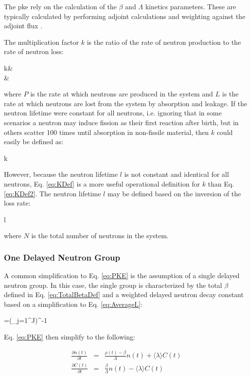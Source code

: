 The \gls{pke} rely on the calculation of the \(\beta\) and \(\Lambda\) kinetics parameters. These are typically calculated by performing adjoint calculations and weighting against the adjoint flux \cite{tyobeka}.

The multiplication factor \(k\) is the ratio of the rate of neutron production to the rate of neutron loss:

\beqa
\label{eq:KDef}
k\equiv&\\
\equiv&
\eeqa

where \(P\) is the rate at which neutrons are produced in the system and \(L\) is the rate at which neutrons are lost from the system by absorption and leakage. If the neutron lifetime were constant for all neutrons, i.e. ignoring that in some scenarios a neutron may induce fission as their first reaction after birth, but in others scatter 100 times until absorption in non-fissile material, then \(k\) could easily be defined as:

\beq
\label{eq:KDef2}
k\equiv{}
\eeq

However, because the neutron lifetime \(l\) is not constant and identical for all neutrons, Eq. \eqref{eq:KDef} is a more useful operational definition for \(k\) than Eq. \eqref{eq:KDef2}. The neutron lifetime \(l\) may be defined based on the inversion of the loss rate:

\beq
\label{eq:NeutronLifetime}
l\equiv{}
\eeq

where \(N\) is the total number of neutrons in the system.

\subsubsection{One Delayed Neutron Group}
\label{sec:OneDelayedGroup}
A common simplification to Eq. \eqref{eq:PKE} is the assumption of a single delayed neutron group. In this case, the single group is characterized by the total \(\beta\) defined in Eq. \eqref{eq:TotalBetaDef} and a weighted delayed neutron decay constant based on a simplification to Eq. \eqref{eq:AverageL}:

\beq
\langle\lambda\rangle=\left(\sum_{j=1}^J\right)^{-1}
\eeq

Eq. \eqref{eq:PKE} then simplify to the following:

\begin{subequations}
\label{eq:PKE2}
\begin{eqnarray}
\frac{\partial n(t)}{\partial t}&=&\frac{\rho(t)-\beta}{\Lambda}n(t)+\langle\lambda\rangle C(t)\\
\frac{\partial C(t)}{\partial t}&=&\frac{\beta}{\Lambda}n(t)-\langle\lambda\rangle C(t)
\end{eqnarray}
\end{subequations}

